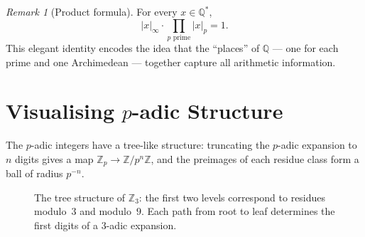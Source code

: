 \documentclass[12pt,a4paper,openany]{book}
\theoremstyle{definition}
\theoremstyle{plain}
\theoremstyle{remark}
\newtheorem{remark}[definition]{Remark}
\newcommand{\Z}{\mathbb{Z}}
\newcommand{\Q}{\mathbb{Q}}
\newcommand{\abs}[1]{\left|#1\right|}
\begin{document}
\begin{remark}[Product formula]
\label{rem:product-formula}
For every $x \in \Q^*$,
\[
  \abs{x}_\infty \cdot \prod_{p \text{ prime}} \abs{x}_p = 1.
\]
This elegant identity encodes the idea that the ``places'' of $\Q$ --- one for
each prime and one Archimedean --- together capture all arithmetic information.
\end{remark}

\section{Visualising \texorpdfstring{$p$}{p}-adic Structure}
\label{sec:p-adic-tikz}

The $p$-adic integers have a tree-like structure: truncating the $p$-adic
expansion to $n$ digits gives a map $\Z_p \to \Z/p^n\Z$, and the preimages
of each residue class form a ball of radius $p^{-n}$.

\begin{figure}[ht]
\centering
{}
\caption{The tree structure of $\Z_3$: the first two levels correspond to
residues modulo~$3$ and modulo~$9$. Each path from root to leaf determines
the first digits of a $3$-adic expansion.}
\label{fig:3-adic-tree}
\end{figure}
\end{document}
